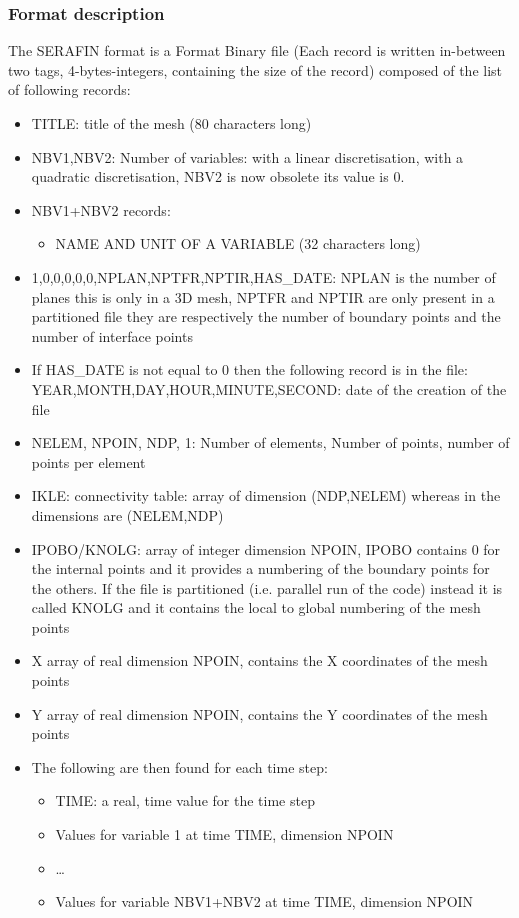 \subsubsection{Format description}
%
The SERAFIN format is a Format Binary file (Each record is written in-between
two tags, 4-bytes-integers, containing the size of the record) composed of
the list of following records:
\begin{itemize}
\item TITLE: title of the mesh (80 characters long)
\item NBV1,NBV2: Number of variables: with a linear discretisation, with a
quadratic discretisation, NBV2 is now obsolete its value is 0.
\item NBV1+NBV2 records:
\begin{itemize}
\item NAME AND UNIT OF A VARIABLE (32 characters long)
\end{itemize}
\item 1,0,0,0,0,0,NPLAN,NPTFR,NPTIR,HAS\_DATE: NPLAN is the number of planes
this is only in a 3D mesh, NPTFR and NPTIR are only present in a partitioned
file they are respectively the number of boundary points and the number of
interface points
\item If HAS\_DATE is not equal to 0 then the following record is in the
file:\\ YEAR,MONTH,DAY,HOUR,MINUTE,SECOND: date of the creation of the file
\item NELEM, NPOIN, NDP, 1: Number of elements, Number of points, number of
points per element
\item IKLE: connectivity table: array of dimension (NDP,NELEM) whereas in
\telemacsystem the dimensions are (NELEM,NDP)
\item IPOBO/KNOLG: array of integer dimension NPOIN, IPOBO contains 0 for the
internal points and it provides a numbering of the boundary points for the
others. If the file is partitioned (i.e. parallel run of the code) instead it
is called KNOLG and it contains the local to global numbering of the mesh
points
\item X array of real dimension NPOIN, contains the X coordinates of the mesh
points
\item Y array of real dimension NPOIN, contains the Y coordinates of the mesh
points
\item The following are then found for each time step:
\begin{itemize}
\item TIME: a real, time value for the time step
\item Values for variable 1 at time TIME, dimension NPOIN
\item \ldots
\item Values for variable NBV1+NBV2 at time TIME, dimension NPOIN
\end{itemize}
\end{itemize}

